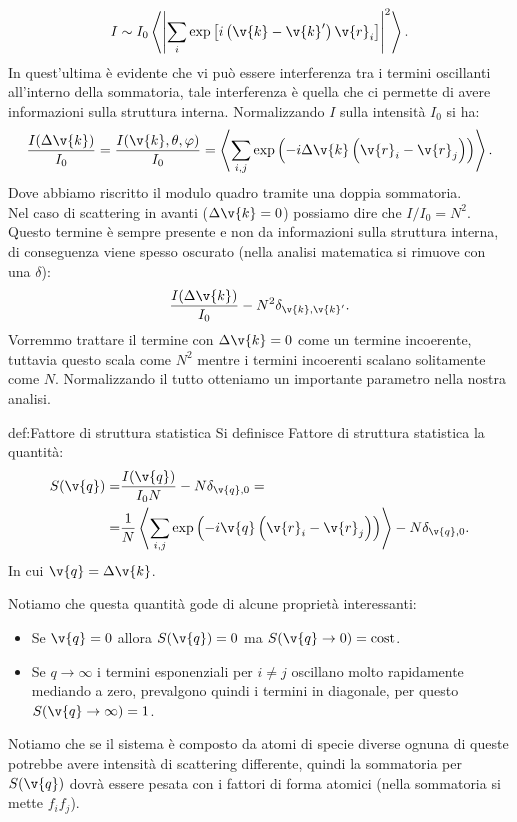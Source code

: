 \[
	I \sim I_0 \left< \left| \sum_{i}^{} \exp \left[ i \left(\v{k}-\v{k}'\right)\v{r}_i  \right]  \right|^2  \right>
.\] 
In quest'ultima è evidente che vi può essere interferenza tra i termini oscillanti all'interno della sommatoria, tale interferenza è quella che ci permette di avere informazioni sulla struttura interna. Normalizzando $I$ sulla intensità $I_0$ si ha:
\[
	\frac{I(\Delta\v{k})}{I_0} 
	=
	\frac{I(\v{k},\theta,\varphi)}{I_0}
	=
	\left< \sum_{i,j}^{} \exp\left( -i \Delta\v{k}\left( \v{r}_i - \v{r}_j \right)  \right)  \right>
.\] 
Dove abbiamo riscritto il modulo quadro tramite una doppia sommatoria.\\
Nel caso di scattering in avanti ($\Delta\v{k}=0$) possiamo dire che $I/I_0 = N^2$. Questo termine è sempre presente e non da informazioni sulla struttura interna, di conseguenza viene spesso oscurato (nella analisi matematica si rimuove con una $\delta$):
\[
	\frac{I(\Delta\v{k})}{I_0}-N^2\delta_{\v{k},\v{k}'}
.\] 
Vorremmo trattare il termine con $\Delta\v{k}=0$ come un termine incoerente, tuttavia questo scala come $N^2$ mentre i termini incoerenti scalano solitamente come $N$. Normalizzando il tutto otteniamo un importante parametro nella nostra analisi.
\begin{defn}{def:Fattore di struttura statistica}
	Si definisce Fattore di struttura statistica la quantità: 
	\[\begin{aligned}
		S(\v{q}) 
		=&
		\frac{I(\v{q})}{I_0N} - N \delta_{\v{q},0} 
		=\\=&
		\frac{1}{N}\left< \sum_{i,j}^{} \exp\left( -i \v{q}\left( \v{r}_i-\v{r}_j \right) \right) \right> - N\delta_{\v{q},0}
	.\end{aligned}\]
	In cui $\v{q}=\Delta\v{k}$.
\end{defn}
Notiamo che questa quantità gode di alcune proprietà interessanti:
\begin{itemize}
	\item Se $\v{q}=0$ allora $S(\v{q})=0$ ma $S(\v{q}\to 0) = \text{cost}$.
	\item Se $q\to \infty$ i termini esponenziali per $i\neq j$ oscillano molto rapidamente mediando a zero, prevalgono quindi i termini in diagonale, per questo 
		$S(\v{q}\to \infty)=1$.
\end{itemize}
Notiamo che se il sistema è composto da atomi di specie diverse ognuna di queste potrebbe avere intensità di scattering differente, quindi la sommatoria per $S(\v{q})$ dovrà essere pesata con i fattori di forma atomici (nella sommatoria si mette $f_if_j$).
